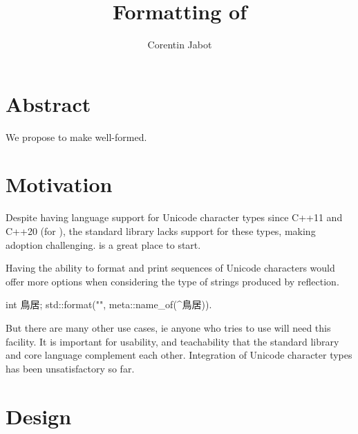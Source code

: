 \documentclass{wg21}
\title{Formatting of \tcode{charN\_t}}
\author{Corentin Jabot}{corentin.jabot@gmail.com}
\begin{document}
\maketitle

\section{Abstract}

We propose to make  well-formed.

\section{Motivation}

Despite having language support for Unicode character types since C++11 and C++20 (for ), the standard library
lacks support for these types, making adoption challenging.
 is a great place to start.

Having the ability to format and print sequences of Unicode characters would offer more options when considering the type of
strings produced by reflection.

\begin{colorblock}
int 鳥居;
std::format("{}", meta::name_of(^鳥居)).
\end{colorblock}

But there are many other use cases, ie anyone who tries to use  will need this facility.
It is important for usability, and teachability that the standard library and core language complement each other.
Integration of Unicode character types has been unsatisfactory so far.

\section{Design}
\end{document}
